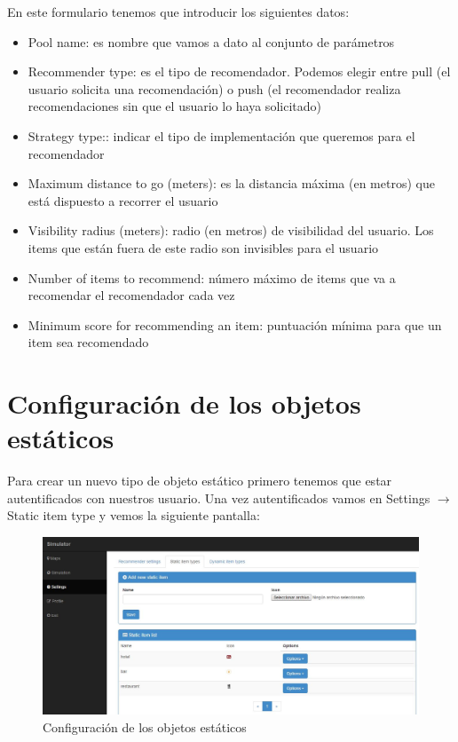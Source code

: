 En este formulario tenemos que introducir los siguientes datos:
\begin{itemize}
	\item Pool name: es nombre que vamos a dato al conjunto de parámetros
	\item Recommender type: es el tipo de recomendador. Podemos elegir entre pull (el usuario solicita una recomendación) o push (el recomendador realiza recomendaciones sin que el usuario lo haya solicitado)
	\item Strategy type:: indicar el tipo de implementación que queremos para el recomendador
	\item Maximum distance to go (meters): es la distancia máxima (en metros) que está dispuesto a recorrer el usuario
	\item Visibility radius (meters): radio (en metros) de visibilidad del usuario. Los items que están fuera de este radio son invisibles para el usuario 
	\item Number of items to recommend: número máximo de items que va a recomendar el recomendador cada vez
	\item Minimum score for recommending an item: puntuación mínima para que un item sea recomendado
\end{itemize}

\newpage

\section{Configuración de los objetos estáticos}\label{sec:confObjEstaticos}

Para crear un nuevo tipo de objeto estático primero tenemos que estar autentificados con nuestros usuario. Una vez autentificados vamos en Settings $\rightarrow$ Static item type y vemos la siguiente pantalla:

\begin{figure}[H]
	\centering\includegraphics[scale=0.25]{imagenes/capitulo3/config-objetos-estaticos.jpg}
	\caption{Configuración de los objetos estáticos}
	\label{img:ConfiguracionObjetosEstaticos}
\end{figure}

